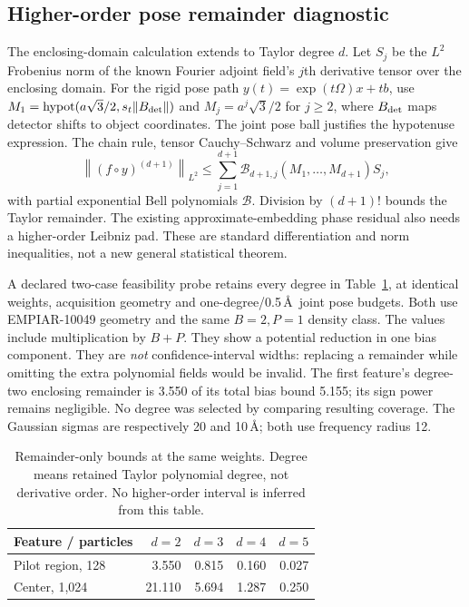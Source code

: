 \subsection{Higher-order pose remainder diagnostic}\label{sec:cubicpose}
The enclosing-domain calculation extends to Taylor degree $d$. Let $S_j$ be
the $L^2$ Frobenius norm of the known Fourier adjoint field's $j$th derivative
tensor over the enclosing domain. For the rigid pose path
$y(t)=\exp(t\Omega)x+t b$, use
$M_1=\operatorname{hypot}(a\sqrt{3}/2,s_t\|B_{\rm det}\|)$ and
$M_j=a^j\sqrt{3}/2$ for $j\ge2$, where $B_{\rm det}$ maps detector shifts to
object coordinates. The joint pose ball justifies the hypotenuse expression.
The chain rule, tensor Cauchy--Schwarz and volume preservation give
\[
 \left\|(f\circ y)^{(d+1)}\right\|_{L^2}
 \le \sum_{j=1}^{d+1}\mathcal B_{d+1,j}(M_1,\ldots,M_{d+1})S_j,
\]
with partial exponential Bell polynomials $\mathcal B$. Division by $(d+1)!$
bounds the Taylor remainder. The existing approximate-embedding phase residual
also needs a higher-order Leibniz pad. These are standard differentiation and
norm inequalities, not a new general statistical theorem.

A declared two-case feasibility probe retains every degree in
Table~\ref{tab:higherremainder}, at identical weights, acquisition geometry and
one-degree/0.5\,\AA\ joint pose budgets. Both use EMPIAR-10049 geometry and the
same $B=2,P=1$ density class. The values include multiplication by $B+P$.
They show a potential reduction in one bias component. They are \emph{not}
confidence-interval widths: replacing a remainder while omitting the extra
polynomial fields would be invalid. The first feature's degree-two enclosing
remainder is 3.550 of its total bias bound 5.155; its sign power remains
negligible. No degree was selected by comparing resulting coverage.
The Gaussian sigmas are respectively 20 and 10\,\AA; both use frequency radius
12.

\begin{table}[h]
\centering
\caption{Remainder-only bounds at the same weights. Degree means retained Taylor
polynomial degree, not derivative order. No higher-order interval is inferred
from this table.}\label{tab:higherremainder}
\begin{tabular}{lrrrr}
\toprule
Feature / particles & $d=2$ & $d=3$ & $d=4$ & $d=5$\\
\midrule
Pilot region, 128 & 3.550 & 0.815 & 0.160 & 0.027\\
Center, 1,024 & 21.110 & 5.694 & 1.287 & 0.250\\
\bottomrule
\end{tabular}
\end{table}

